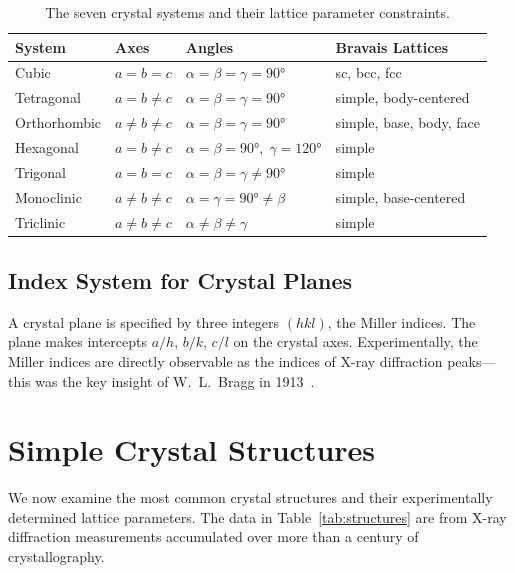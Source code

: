 \begin{table}[H]
\centering
\caption{The seven crystal systems and their lattice parameter constraints.}
\label{tab:bravais}
\begin{tabular}{@{}llll@{}}
\toprule
System & Axes & Angles & Bravais Lattices \\
\midrule
Cubic        & $a = b = c$       & $\alpha = \beta = \gamma = 90°$    & sc, bcc, fcc \\
Tetragonal   & $a = b \neq c$    & $\alpha = \beta = \gamma = 90°$    & simple, body-centered \\
Orthorhombic & $a \neq b \neq c$ & $\alpha = \beta = \gamma = 90°$    & simple, base, body, face \\
Hexagonal    & $a = b \neq c$    & $\alpha = \beta = 90°,\; \gamma = 120°$ & simple \\
Trigonal     & $a = b = c$       & $\alpha = \beta = \gamma \neq 90°$ & simple \\
Monoclinic   & $a \neq b \neq c$ & $\alpha = \gamma = 90° \neq \beta$ & simple, base-centered \\
Triclinic    & $a \neq b \neq c$ & $\alpha \neq \beta \neq \gamma$    & simple \\
\bottomrule
\end{tabular}
\end{table}

\subsection{Index System for Crystal Planes}

A crystal plane is specified by three integers $(hkl)$, the Miller indices. The plane makes intercepts $a/h$, $b/k$, $c/l$ on the crystal axes. Experimentally, the Miller indices are directly observable as the indices of X-ray diffraction peaks---this was the key insight of W.~L.~Bragg in 1913~\cite{bragg1913structure}.


\section{Simple Crystal Structures}

We now examine the most common crystal structures and their experimentally determined lattice parameters. The data in Table~\ref{tab:structures} are from X-ray diffraction measurements accumulated over more than a century of crystallography.

